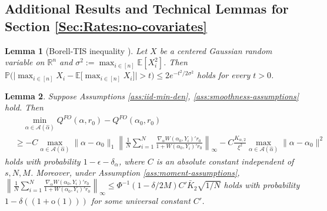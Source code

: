 \documentclass[11pt]{article}
\newtheorem{lemma}{Lemma}
\begin{document}
\subsection{Additional Results and Technical Lemmas for Section \ref{Sec:Rates:no-covariates}}\label{appendix:no-covariate}
\begin{lemma}[Borell-TIS inequality \citep{borell1975brunn}]\label{lemma:borell} 
Let $X$ be a centered Gaussian random variable on $\mathbb{R}^n$ and $\displaystyle\sigma^2:=\max_{i\in[n]}\mathbb{E}[X_i^2]$. Then $\displaystyle\mathbb{P}\bigg(\bigg|\max_{i\in[n]}X_i-\mathbb{E}\big[\max_{i\in[n]}X_i\big]\bigg|>t\bigg)\leq 2e^{-t^2/2\sigma^2}$ holds for every $t>0$. \end{lemma}

\begin{lemma}\label{lemma:MinMax:Claim1}
Suppose Assumptions \ref{ass:iid-min-den}, \ref{ass:smoothness-assumptions} hold. Then $$\begin{array}{rl}
&\quad\displaystyle\min_{\alpha \in \mathcal{A}(\hat\alpha)} Q^{FO}(\alpha,r_0)-Q^{FO}(\alpha_0,r_0) \\
&\displaystyle\geq- C\max_{\alpha \in \mathcal{A}(\hat\alpha)}\|\alpha-\alpha_0\|_1 \left\| \frac{1}{N}\sum_{i=1}^N \frac{\nabla_\alpha W(\alpha_0,Y_i)'r_0}{1+W(\alpha_0,Y_i)'r_0} \right\|_\infty -C\frac{K_{\alpha,2}}{\xi^2}\max_{\alpha \in \mathcal{A}(\hat\alpha)} \|\alpha - \alpha_0\|^2
\end{array}$$ 
holds with probability $1-\epsilon-\delta_{\alpha}$, where $C$ is an absolute constant independent of $s,N,M$. Moreover, under Assumption \ref{ass:moment-assumptions}, $\left\| \frac{1}{N}\sum_{i=1}^N \frac{\nabla_\alpha W(\alpha_0,Y_i)'r_0}{1+W(\alpha_0,Y_i)'r_0} \right\|_\infty \leq \Phi^{-1}(1-\delta/2M) C'\bar K_2\sqrt{1/N}$ holds with probability $1-\delta((1+\mathrm{o}(1)))$ for some universal constant $C'$.
\end{lemma}
\end{document}

